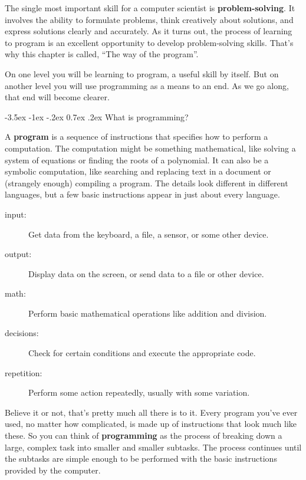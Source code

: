 \documentclass[12pt]{book}
\makeatletter
\theoremstyle{exercise}
\renewcommand{\section}{\@startsection{section}{1}{\z@}%
    {-3.5ex \@plus -1ex \@minus -.2ex}%
    {0.7ex \@plus.2ex}%
    {\normalfont\Large\bfseries}}
\makeatother
\begin{document}

The single most important skill for a computer scientist is {\bf problem-solving}.
It involves the ability to formulate problems, think creatively about solutions, and express solutions clearly and accurately.
As it turns out, the process of learning to program is an excellent opportunity to develop problem-solving skills.
That's why this chapter is called, ``The way of the program''.

On one level you will be learning to program, a useful skill by itself.
But on another level you will use programming as a means to an end.
As we go along, that end will become clearer.


\section{What is programming?}


A {\bf program} is a sequence of instructions that specifies how to perform a computation.
The computation might be something mathematical, like solving a system of equations or finding the roots of a polynomial.
It can also be a symbolic computation, like searching and replacing text in a document or (strangely enough) compiling a program.
The details look different in different languages, but a few basic instructions appear in just about every language.

\begin{description}
\item[input:] Get data from the keyboard, a file, a sensor, or some other device.
\item[output:] Display data on the screen, or send data to a file or other device.
\item[math:] Perform basic mathematical operations like addition and division.
\item[decisions:] Check for certain conditions and execute the appropriate code.
\item[repetition:] Perform some action repeatedly, usually with some variation.
\end{description}


Believe it or not, that's pretty much all there is to it.
Every program you've ever used, no matter how complicated, is made up of instructions that look much like these.
So you can think of {\bf programming} as the process of breaking down a large, complex task into smaller and smaller subtasks.
The process continues until the subtasks are simple enough to be performed with the basic instructions provided by the computer.
\end{document}
